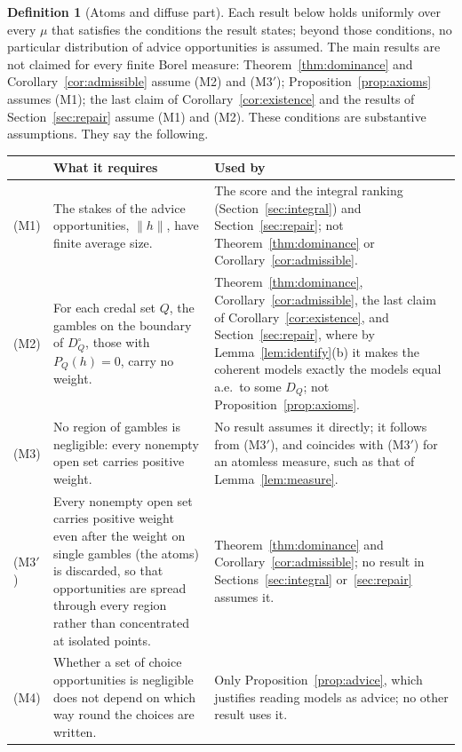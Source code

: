 \documentclass[11pt]{article}
\theoremstyle{plain}
\theoremstyle{definition}
\newtheorem{definition}[theorem]{Definition}
\begin{document}
\begin{definition}[Atoms and diffuse part]
Each result below holds uniformly over every $\mu$ that satisfies the conditions the result
states; beyond those conditions, no particular distribution of advice opportunities is
assumed. The main results are not claimed for every finite Borel measure:
Theorem~\ref{thm:dominance} and Corollary~\ref{cor:admissible} assume (M2) and (M3$'$);
Proposition~\ref{prop:axioms} assumes (M1); the last claim of Corollary~\ref{cor:existence}
and the results of Section~\ref{sec:repair} assume (M1) and (M2). These
conditions are substantive assumptions. They say the following.
\begin{center}
\small
\begin{tabular}{@{}>{\raggedright\arraybackslash}p{}>{\raggedright\arraybackslash}p{}>{\raggedright\arraybackslash}p{}@{}}
\hline
& \textbf{What it requires} & \textbf{Used by}\\
\hline
(M1) & The stakes of the advice opportunities, $\|h\|$, have finite average size. & The score and
the integral ranking (Section~\ref{sec:integral}) and Section~\ref{sec:repair}; not
Theorem~\ref{thm:dominance} or Corollary~\ref{cor:admissible}.\\[2pt]
(M2) & For each credal set $Q$, the gambles on the boundary of $D_Q^\circ$, those with
$P_Q(h)=0$, carry no weight. & Theorem~\ref{thm:dominance}, Corollary~\ref{cor:admissible},
the last claim of Corollary~\ref{cor:existence}, and Section~\ref{sec:repair}, where by
Lemma~\ref{lem:identify}(b) it makes the coherent models exactly the models equal a.e.\ to
some $D_Q$; not Proposition~\ref{prop:axioms}.\\[2pt]
(M3) & No region of gambles is negligible: every nonempty open set carries positive weight. &
No result assumes it directly; it follows from (M3$'$), and coincides with (M3$'$) for an
atomless measure, such as that of Lemma~\ref{lem:measure}.\\[2pt]
(M3$'$) & Every nonempty open set carries positive weight even after the weight on single
gambles (the atoms) is discarded, so that opportunities are spread through every region
rather than concentrated at isolated points. & Theorem~\ref{thm:dominance} and
Corollary~\ref{cor:admissible}; no result in Sections~\ref{sec:integral}
or~\ref{sec:repair} assumes it.\\[2pt]
(M4) & Whether a set of choice opportunities is negligible does not depend on which way round
the choices are written. & Only Proposition~\ref{prop:advice}, which justifies reading models as
advice; no other result uses it.\\
\hline
\end{tabular}
\end{center}
\end{definition}
\end{document}
